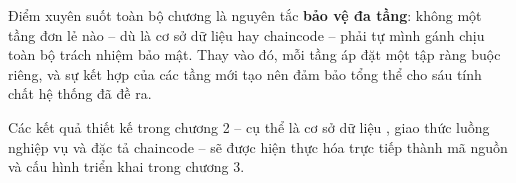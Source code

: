 Điểm xuyên suốt toàn bộ chương là nguyên tắc \textbf{bảo vệ đa tầng}: không một tầng đơn lẻ nào -- dù là cơ sở dữ liệu hay chaincode -- phải tự mình gánh chịu toàn bộ trách nhiệm bảo mật. Thay vào đó, mỗi tầng áp đặt một tập ràng buộc riêng, và sự kết hợp của các tầng mới tạo nên đảm bảo tổng thể cho sáu tính chất hệ thống đã đề ra.

Các kết quả thiết kế trong chương 2 -- cụ thể là cơ sở dữ liệu , giao thức luồng nghiệp vụ và đặc tả chaincode -- sẽ được hiện thực hóa trực tiếp thành mã nguồn và cấu hình triển khai trong chương 3.
